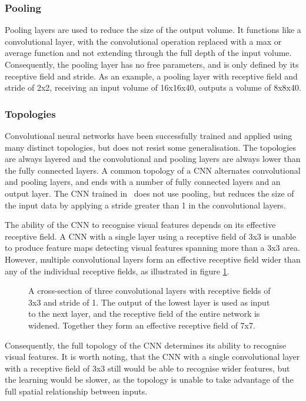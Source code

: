 \subsubsection{Pooling}
Pooling layers are used to reduce the size of the output volume. It functions like a convolutional layer, with the convolutional operation replaced with a max or average function and not extending through the full depth of the input volume. Consequently, the pooling layer has no free parameters, and is only defined by its receptive field and stride. As an example, a pooling layer with receptive field and stride of 2x2, receiving an input volume of 16x16x40, outputs a volume of 8x8x40.

\subsubsection{Topologies}
\label{sec:topologies}
Convolutional neural networks have been successfully trained and applied using many distinct topologies, but does not resist some generalisation. The topologies are always layered and the convolutional and pooling layers are always lower than the fully connected layers. A common topology of a CNN alternates convolutional and pooling layers, and ends with a number of fully connected layers and an output layer. The CNN trained in~\cite{chen} does not use pooling, but reduces the size of the input data by applying a stride greater than 1 in the convolutional layers.

The ability of the CNN to recognise visual features depends on its effective receptive field. A CNN with a single layer using a receptive field of 3x3 is unable to produce feature maps detecting visual features spanning more than a 3x3 area. However, multiple convolutional layers form an effective receptive field wider than any of the individual receptive fields, as illustrated in figure \ref{fig:convolutionalstacking}.
\begin{figure}[H]
    \centering
    
    \caption[Stacking of convolutional layers]{A cross-section of three convolutional layers with receptive fields of 3x3 and stride of 1. The output of the lowest layer is used as input to the next layer, and the receptive field of the entire network is widened. Together they form an effective receptive field of 7x7.}
    \label{fig:convolutionalstacking}
\end{figure}

\noindent
Consequently, the full topology of the CNN determines its ability to recognise visual features. It is worth noting, that the CNN with a single convolutional layer with a receptive field of 3x3 still would be able to recognise wider features, but the learning would be slower, as the topology is unable to take advantage of the full spatial relationship between inputs.

